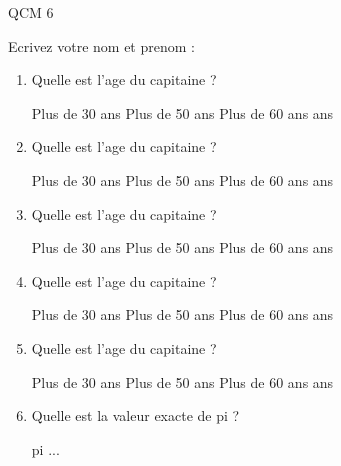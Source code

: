\documentclass[a4paper, 11pt]{article}
\begin{document}
	QCM 6
	
	Ecrivez votre nom et prenom :
	\begin{qcm}
		\begin{enumerate}
			\item Quelle est l'age du capitaine ?
			\begin{tabenum} [1)]
				\tabenumitem Plus de 30 ans
				\tabenumitem Plus de 50 ans
				\tabenumitem Plus de 60 ans
				 ans
			\end{tabenum}
		\vspace{5mm}

			\item Quelle est l'age du capitaine ?
			\begin{tabenum} [1)]
				\tabenumitem Plus de 30 ans
				\tabenumitem Plus de 50 ans
				\tabenumitem Plus de 60 ans
				 ans
			\end{tabenum}
		\vspace{5mm}

			\item Quelle est l'age du capitaine ?
			\begin{tabenum} [1)]
				\tabenumitem Plus de 30 ans
				\tabenumitem Plus de 50 ans
				\tabenumitem Plus de 60 ans
				 ans
			\end{tabenum}
		\vspace{5mm}

			\item Quelle est l'age du capitaine ?
			\begin{tabenum} [1)]
				\tabenumitem Plus de 30 ans
				\tabenumitem Plus de 50 ans
				\tabenumitem Plus de 60 ans
				 ans
			\end{tabenum}
		\vspace{5mm}

			\item Quelle est l'age du capitaine ?
			\begin{tabenum} [1)]
				\tabenumitem Plus de 30 ans
				\tabenumitem Plus de 50 ans
				\tabenumitem Plus de 60 ans
				 ans
			\end{tabenum}
		\vspace{5mm}

			\item Quelle est la valeur exacte de pi ?
			\begin{tabenum} [1)]
				\tabenumitem pi
				...
			\end{tabenum}
		\vspace{5mm}

		\end{enumerate}
	\end{qcm}
\end{document}
